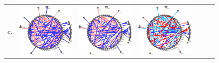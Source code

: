 \documentclass{bioinfo}
\begin{document}
\begin{figure}
\begin{tabular}{lcccccc}
 c.   & \includegraphics[scale=0.15]{results/joint/t1.png}
    &     \includegraphics[scale=0.15]{results/joint/t2.png}
    &     \includegraphics[scale=0.15]{results/joint/t3.png} 

\end{tabular}
\end{figure}
\end{document}
